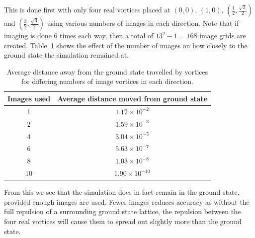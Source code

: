 \documentclass{article}
\numberwithin{equation}{section}
\begin{document}
This is done first with only four real vortices placed at $(0, 0)$, $(1, 0)$, $(\frac{1}{2}, \frac{\sqrt{3}}{2})$ and $(\frac{3}{2}, \frac{\sqrt{3}}{2})$ using various numbers of images in each direction. Note that if imaging is done 6 times each way, then a total of $13^2-1=168$ image grids are created. Table~\ref{tab:dist_from_images} shows the effect of the number of images on how closely to the ground state the simulation remained at.
\begin{table}[htb]
    \centering
    \begin{tabular}{c|c}
        Images used & Average distance moved from ground state \\
        \hline
        1 & $1.12\times 10^{-2}$ \\
        2 & $1.59\times 10^{-3}$ \\
        4 & $3.04\times 10^{-5}$ \\
        6 & $5.63\times 10^{-7}$ \\
        8 & $1.03\times 10^{-8}$ \\
        10 & $1.90\times 10^{-10}$ \\
    \end{tabular}
    \caption{Average distance away from the ground state travelled by vortices for differing numbers of image vortices in each direction.}
    \label{tab:dist_from_images}
\end{table}
From this we see that the simulation does in fact remain in the ground state, provided enough images are used. Fewer images reduces accuracy as without the full repulsion of a surrounding ground state lattice, the repulsion between the four real vortices will cause them to spread out slightly more than the ground state.
\end{document}
